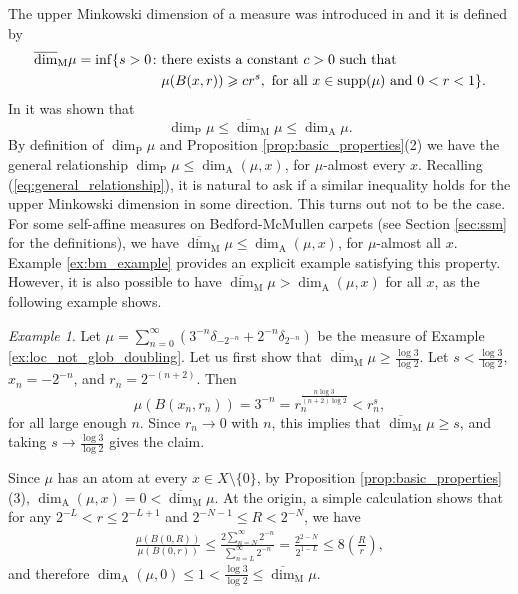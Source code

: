 \documentclass{PRM}
\newcommand{\updim}{\overline{\dim}}
\newcommand{\adim}{\dim_{\mathrm{A}}}
\theoremstyle{plain}
\theoremstyle{definition}
\theoremstyle{remark}
\newtheorem{example}[thm]{Example}
\begin{document}
The upper Minkowski dimension of a measure was introduced in \cite{KFF} and it is defined by
\begin{align*}
    \updim_{\mathrm{M}}\mu=\inf\{s>0\colon &\textnormal{there exists a constant }c>0\textnormal{ such that}\\
    &\mu(B(x,r))\geq cr^s,  \textnormal{ for all }x\in \text{supp}(\mu)\textnormal{ and }0<r<1\}.
\end{align*}
In \cite[Proposition 4.1]{KFF} it was shown that
\begin{equation}\label{eq:general_relationship}
    \dim_{\mathrm{P}}\mu\leq \updim_{\mathrm{M}}\mu\leq \dim_{\mathrm{A}}\mu.
\end{equation}
By definition of $\dim_{\mathrm{P}}\mu$ and Proposition \ref{prop:basic_properties}(2) we have the general relationship $\dim_{\mathrm{P}}\mu\leq\dim_{\mathrm{A}}(\mu,x)$, for $\mu$-almost every $x$. Recalling (\ref{eq:general_relationship}), it is natural to ask if a similar inequality holds for the upper Minkowski dimension in some direction. This turns out not to be the case. For some self-affine measures on Bedford-McMullen carpets (see Section \ref{sec:ssm} for the definitions), we have $\updim_{\mathrm{M}}\mu \leq\adim(\mu,x)$, for $\mu$-almost all $x$. Example \ref{ex:bm_example} provides an explicit example satisfying this property. However, it is also possible to have $\updim_{\mathrm{M}}\mu >\adim(\mu,x)$ for all $x$, as the following example shows.

\begin{example}
    Let $\mu=\sum_{n=0}^{\infty}(3^{-n}\delta_{-2^{-n}}+2^{-n}\delta_{2^{-n}})$ be the measure of Example \ref{ex:loc_not_glob_doubling}. Let us first show that $\updim_{\mathrm{M}}\mu\geq \frac{\log 3}{\log 2}$. Let $s<\frac{\log 3}{\log 2}$, $x_n=-2^{-n}$, and $r_n=2^{-(n+2)}$. Then
    \begin{equation*}
        \mu(B(x_n,r_n))=3^{-n}=r_n^{\frac{n\log 3}{(n+2)\log 2}}< r_n^{s},
    \end{equation*}
    for all large enough $n$. Since $r_n\to 0$ with $n$, this implies that $\updim_{\mathrm{M}}\mu\geq s$, and taking $s\to\frac{\log 3}{\log 2}$ gives the claim.
    
   Since $\mu$ has an atom at every $x\in X\setminus\{0\}$, by Proposition \ref{prop:basic_properties}(3), $\dim_{\mathrm{A}}(\mu,x)=0<\updim_{\mathrm{M}}\mu$. At the origin, a simple calculation shows that for any $2^{-L}< r \leq 2^{-L+1}$ and $2^{-N-1}\leq R < 2^{-N}$, we have
    \begin{align*}
        \frac{\mu(B(0,R))}{\mu(B(0,r))}\leq \frac{2\sum_{n=N}^{\infty}2^{-n}}{\sum_{n=L}^{\infty}2^{-n}}=\frac{2^{2-N}}{2^{1-L}}\leq 8\left(\frac{R}{r}\right),
    \end{align*}
    and therefore $\dim_{\mathrm{A}}(\mu,0)\leq1<\frac{\log3}{\log 2}\leq \updim_{\mathrm{M}}\mu$.
\end{example}
\end{document}
